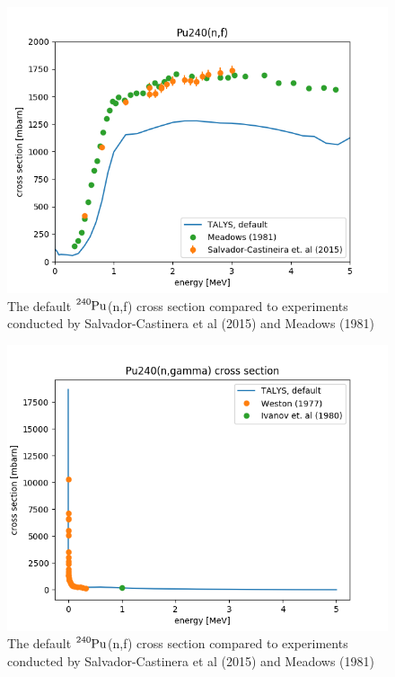 \documentclass[]{article}
\begin{document}
  \begin{figure} [H]
	\centering
	\includegraphics[scale=0.7]{Default_TALYS_fission_xs_to_exp.png}
	\caption{The default $\ce{^{240}Pu}$(n,f) cross section compared to experiments conducted by Salvador-Castinera et al (2015) and Meadows (1981) }
	\label{fig:Default_TALYS_fission_xs_to_exp}
\end{figure}

  \begin{figure} [H]
	\centering
	\includegraphics[scale=0.7]{Default_TALYS_gamma_xs_vs_exp.png}
	\caption{The default $\ce{^{240}Pu}$(n,f) cross section compared to experiments conducted by Salvador-Castinera et al (2015) and Meadows (1981) }
	\label{fig:Default_TALYS_gamma_xs_vs_exp}
\end{figure}
\end{document}
